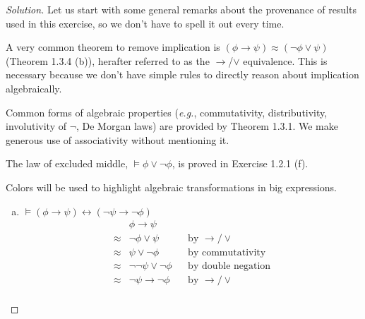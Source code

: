 \documentclass[letter]{article}
\theoremstyle{definition}
\newenvironment{solution}
{\begin{proof}[Solution]}
	{\end{proof}}
\begin{document}
\begin{solution}
\newcommand*\tolor{{$\to$/$\lor$}}
\newcommand*\colop[2]{\mathbin{\color{#1}#2}} %
%
Let us start with some general remarks about the provenance of results used in
this exercise, so we don't have to spell it out every time.

A very common theorem to remove implication is
$(\phi \to \psi) \approx (\neg\phi \lor \psi)$
(Theorem 1.3.4 (b)), herafter referred to as the \tolor{} equivalence.
This is necessary because we don't have simple rules to directly reason about
implication algebraically.

Common forms of algebraic properties (\textit{e.g.}, commutativity,
distributivity, involutivity of $\neg$, De Morgan laws) are provided by
Theorem 1.3.1. We make generous use of associativity without mentioning it.

The law of excluded middle, $\models \phi \lor \neg \phi$,
is proved in Exercise 1.2.1 (f).

Colors will be used to highlight algebraic transformations in big expressions.

\begin{enumerate}[(a)]
  \item $\models (\phi \to \psi) \leftrightarrow (\neg \psi \to \neg \phi)$
\begin{align*}
  & \phi \to \psi && \\
\approx{} & \neg \phi \lor \psi     && \text{by \tolor{}} \\
\approx{} & \psi \lor \neg \phi     && \text{by commutativity} \\
\approx{} & \neg \neg \psi \lor \neg \phi  && \text{by double negation} \\
\approx{} & \neg \psi \to \neg \phi && \text{by \tolor{}} \\
\end{align*}


\end{enumerate}
\end{solution}
\end{document}
